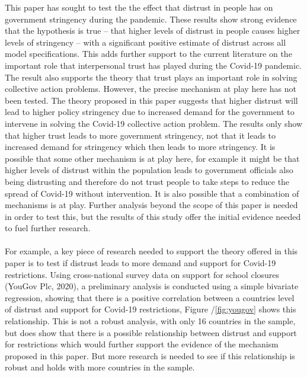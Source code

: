 \documentclass[
  12pt,
]{article}
\begin{document}
This paper has sought to test the the effect that distrust in people has on government stringency during the pandemic. These results show strong evidence that the hypothesis is true -- that higher levels of distrust in people causes higher levels of stringency -- with a significant positive estimate of distrust across all model specifications. This adds further support to the current literature on the important role that interpersonal trust has played during the Covid-19 pandemic. The result also supports the theory that trust plays an important role in solving collective action problems. However, the precise mechanism at play here has not been tested. The theory proposed in this paper suggests that higher distrust will lead to higher policy stringency due to increased demand for the government to intervene in solving the Covid-19 collective action problem. The results only show that higher trust leads to more government stringency, not that it leads to increased demand for stringency which then leads to more stringency. It is possible that some other mechanism is at play here, for example it might be that higher levels of distrust within the population leads to government officials also being distrusting and therefore do not trust people to take steps to reduce the spread of Covid-19 without intervention. It is also possible that a combination of mechanisms is at play. Further analysis beyond the scope of this paper is needed in order to test this, but the results of this study offer the initial evidence needed to fuel further research.\\
~\\
For example, a key piece of research needed to support the theory offered in this paper is to test if distrust leads to more demand and support for Covid-19 restrictions. Using cross-national survey data on support for school closures (YouGov Plc, 2020), a preliminary analysis is conducted using a simple bivariate regression, showing that there is a positive correlation between a countries level of distrust and support for Covid-19 restrictions, Figure /\ref{fig:yougov} shows this relationship. This is not a robust analysis, with only 16 countries in the sample, but does show that there is a possible relationship between distrust and support for restrictions which would further support the evidence of the mechanism proposed in this paper. But more research is needed to see if this relationship is robust and holds with more countries in the sample.\\
~\\
\end{document}
